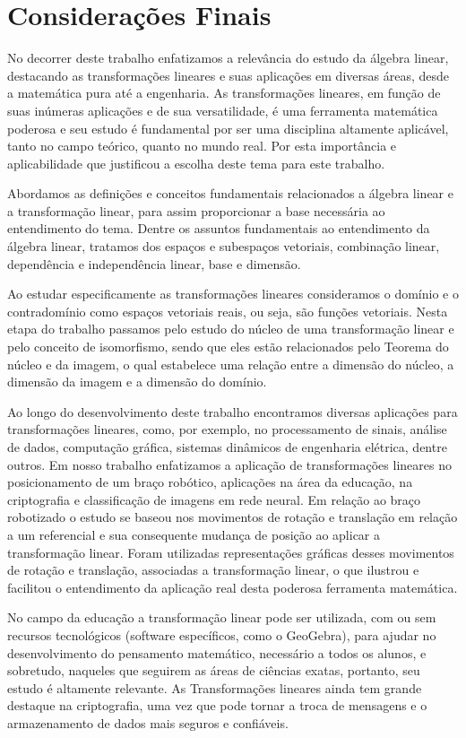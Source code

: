 \chapter{Considerações Finais}
No decorrer deste trabalho enfatizamos a relevância do estudo da álgebra linear, destacando as transformações lineares e suas aplicações em diversas áreas, desde a matemática pura até a engenharia. As transformações lineares, em função de suas inúmeras aplicações e de sua versatilidade, é uma ferramenta matemática poderosa e seu estudo é fundamental por ser uma disciplina altamente aplicável, tanto no campo teórico, quanto no mundo real. Por esta importância e aplicabilidade que justificou a escolha deste tema para este trabalho.

Abordamos as definições e conceitos fundamentais relacionados a álgebra linear e a transformação linear, para assim proporcionar a base necessária ao entendimento do tema. Dentre os assuntos fundamentais ao entendimento da álgebra linear, tratamos dos espaços e subespaços vetoriais, combinação linear, dependência e independência linear, base e dimensão.

Ao estudar especificamente as transformações lineares consideramos o domínio e o contradomínio como espaços vetoriais reais, ou seja, são funções vetoriais. Nesta etapa do trabalho passamos pelo estudo do núcleo de uma transformação linear e pelo conceito de isomorfismo, sendo que eles estão relacionados pelo Teorema do núcleo e da imagem, o qual estabelece uma relação entre a dimensão do núcleo, a dimensão da imagem e a dimensão do domínio.

Ao longo do desenvolvimento deste trabalho encontramos diversas aplicações para transformações lineares, como, por exemplo, no processamento de sinais, análise de dados, computação gráfica, sistemas dinâmicos de engenharia elétrica, dentre outros. Em nosso trabalho enfatizamos a aplicação de transformações lineares no posicionamento de um braço robótico, aplicações na área da educação, na criptografia e classificação de imagens em rede neural. Em relação ao braço robotizado o estudo se baseou nos movimentos de rotação e translação em relação a um referencial e sua consequente mudança de posição ao aplicar a transformação linear. Foram utilizadas representações gráficas desses movimentos de rotação e translação, associadas a transformação linear, o que ilustrou e facilitou o entendimento da aplicação real desta poderosa  ferramenta matemática.

No campo da educação a transformação linear pode ser utilizada, com ou sem recursos tecnológicos (software específicos, como o GeoGebra), para ajudar no desenvolvimento do pensamento matemático, necessário a todos os alunos, e sobretudo, naqueles que seguirem as áreas de ciências exatas, portanto, seu estudo é altamente relevante. As Transformações lineares ainda tem grande destaque na criptografia, uma vez que pode tornar a troca de mensagens e o armazenamento de dados mais seguros e confiáveis.

